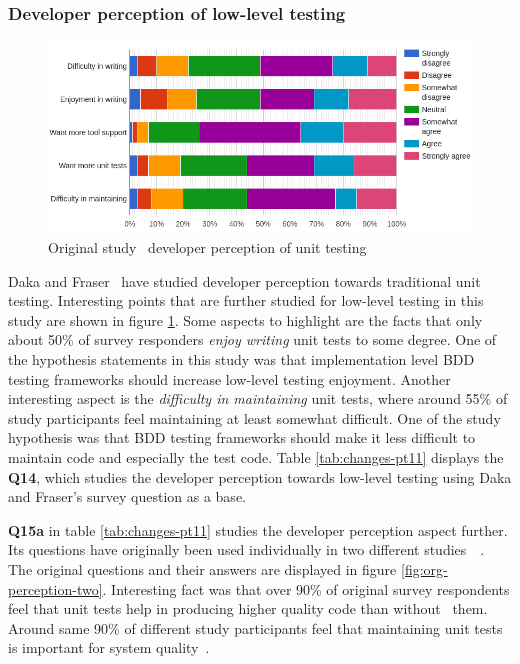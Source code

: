 \subsubsection{Developer perception of low-level testing}
    \begin{figure}[ht]
      \begin{center}
        \includegraphics[width=14.7cm]{images/perception-org.png}
        \caption{Original study~\cite{daka2014survey} developer perception of unit testing}
        \label{fig:org-perception}
      \end{center}
    \end{figure}

Daka and Fraser~\cite{daka2014survey} have studied developer perception towards traditional unit testing. Interesting
points that are further studied for low-level testing in this study are shown in figure \ref{fig:org-perception}. Some
aspects to highlight are the facts that only about 50\% of survey responders \textit{enjoy writing} unit tests to some degree.
One of the hypothesis statements in this study was that implementation level BDD testing frameworks should increase low-level testing enjoyment.
Another interesting aspect is the \textit{difficulty in maintaining} unit tests, where around 55\% of study participants
feel maintaining at least somewhat difficult. One of the study hypothesis was that BDD testing frameworks should
make it less difficult to maintain code and especially the test code. Table \ref{tab:changes-pt11} displays the \textbf{Q14}, which studies
the developer perception towards low-level testing using Daka and Fraser's survey question as a base.

\textbf{Q15a} in table \ref{tab:changes-pt11} studies the developer perception aspect further. Its questions have originally
been used individually in two different studies~\cite{williams2009effectiveness}~\cite{li2016automatically}. The original
questions and their answers are displayed in figure \ref{fig:org-perception-two}. Interesting fact was that over 90\% of
original survey respondents feel that unit tests help in producing higher quality code than without~\cite{williams2009effectiveness} them.
Around same 90\% of different study participants feel that maintaining unit tests is important for system quality~\cite{li2016automatically}.

